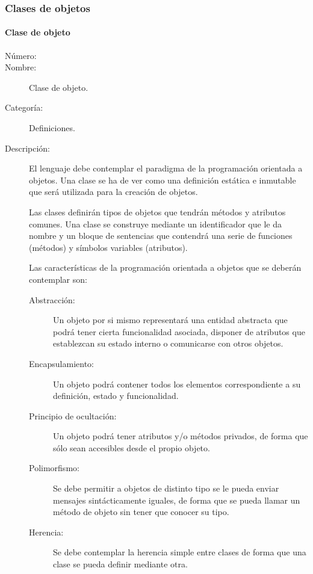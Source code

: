 \subsubsection{Clases de objetos}
\paragraph{Clase de objeto}
	\begin{description}
		\item [Número:] \cn
		\item [Nombre:] Clase de objeto.
		\item [Categoría:] Definiciones.
		\item [Descripción:] El lenguaje debe contemplar el paradigma de la programación orientada a objetos. Una clase
      se ha de ver como una definición estática e inmutable que será utilizada para la creación de objetos.
      
      Las clases definirán tipos de objetos que tendrán métodos y atributos comunes. Una clase se construye
		mediante un identificador que le da nombre y un bloque de sentencias que contendrá una serie de funciones (métodos)
		y símbolos variables (atributos).  
      
      Las características de la programación orientada a objetos que se deberán contemplar son:
		\begin{description}
			\item [Abstracción:] Un objeto por si mismo representará una entidad abstracta que podrá tener cierta funcionalidad
			asociada, disponer de atributos que establezcan su estado interno o comunicarse con otros objetos. 
			\item [Encapsulamiento:] Un objeto podrá contener todos los elementos correspondiente a su definición, estado y funcionalidad.
         \item [Principio de ocultación:] Un objeto podrá tener atributos y/o métodos privados, de forma que sólo sean
         accesibles desde el propio objeto. 
			\item [Polimorfismo:] Se debe permitir a objetos de distinto tipo se le pueda enviar mensajes sintácticamente iguales, de forma
			que se pueda  llamar un método de objeto sin tener que conocer su tipo.
			\item [Herencia:] Se debe contemplar la herencia simple entre clases de forma que  una clase se pueda definir mediante otra.
		\end{description}
	\end {description}

